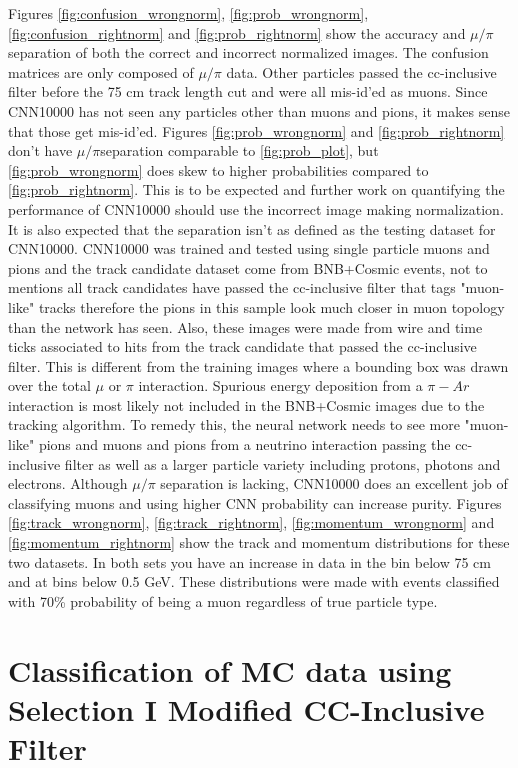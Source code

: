 Figures \ref{fig:confusion_wrongnorm}, \ref{fig:prob_wrongnorm}, \ref{fig:confusion_rightnorm} and \ref{fig:prob_rightnorm} show the accuracy and $\mu/\pi$ separation of both the correct and incorrect normalized images. The confusion matrices are only composed of $\mu/\pi$ data. Other particles passed the cc-inclusive filter before the 75 cm track length cut and were all mis-id'ed as muons. Since CNN10000 has not seen any particles other than muons and pions, it makes sense that those get mis-id'ed. Figures \ref{fig:prob_wrongnorm} and \ref{fig:prob_rightnorm} don't have $\mu/\pi$separation comparable to \ref{fig:prob_plot}, but \ref{fig:prob_wrongnorm} does skew to higher probabilities compared to \ref{fig:prob_rightnorm}. This is to be expected and further work on quantifying the performance of CNN10000 should use the incorrect image making normalization. It is also expected that the separation isn't as defined as the testing dataset for CNN10000. CNN10000 was trained and tested using single particle muons and pions and the track candidate dataset come from BNB+Cosmic events, not to mentions all track candidates have passed the cc-inclusive filter that tags "muon-like" tracks therefore the pions in this sample look much closer in muon topology than the network has seen. Also, these images were made from wire and time ticks associated to hits from the track candidate that passed the cc-inclusive filter. This is different from the training images where a bounding box was drawn over the total $\mu$ or $\pi$ interaction. Spurious energy deposition from a $\pi-Ar$ interaction is most likely not included in the BNB+Cosmic images due to the tracking algorithm. To remedy this, the neural network needs to see more "muon-like" pions and muons and pions from a neutrino interaction passing the cc-inclusive filter as well as a larger particle variety including protons, photons and electrons. Although $\mu/\pi$ separation is lacking, CNN10000 does an excellent job of classifying muons and using higher CNN probability can increase purity. Figures \ref{fig:track_wrongnorm}, \ref{fig:track_rightnorm}, \ref{fig:momentum_wrongnorm} and \ref{fig:momentum_rightnorm} show the track and momentum distributions for these two datasets. In both sets you have an increase in data in the bin below 75 cm and at bins below 0.5 GeV. These distributions were made with events classified with 70\% probability of being a muon regardless of true particle type. 

\section{Classification of MC data using Selection I Modified CC-Inclusive Filter}

